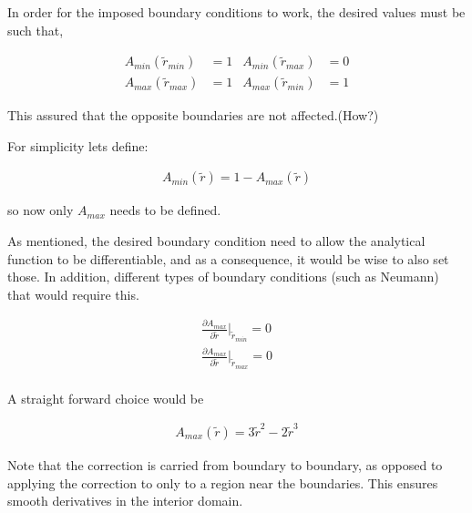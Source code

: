 \documentclass[a4paper]{article}
\begin{document}
In order for the imposed boundary conditions to work, the desired values must be 
such that,

\begin{align*}
    A_{min}(\widetilde{r}_{min}) &= 1 &A_{min}(\widetilde{r}_{max}) &= 0  \\
    A_{max}(\widetilde{r}_{max}) &= 1 &A_{max}(\widetilde{r}_{min}) &= 1 
\end{align*}

This assured that the opposite boundaries are not affected.(How?)

For simplicity lets define:

\begin{align*}
    A_{min}(\widetilde{r}) =
    1-
    A_{max}(\widetilde{r}) 
\end{align*}

so now only $A_{max}$ needs to be defined. 

As mentioned, the desired boundary condition need to allow the analytical function
to be differentiable, and as a consequence, it would be wise to also set those. 
In addition, different types of boundary conditions (such as Neumann) that would 
require this. 

\begin{align*}
    \frac{\partial A_{max} }{\partial \widetilde{r}}|_{\widetilde{r}_{min}} = 0 \\
    \frac{\partial A_{max} }{\partial \widetilde{r}}|_{\widetilde{r}_{max}} = 0 \\
\end{align*}

A straight forward choice would be 

\begin{align*}
    A_{max}(\widetilde{r}) = 
    3 \widetilde{r}^2 - 2 \widetilde{r}^3
\end{align*}

Note that the correction is carried from boundary to boundary, as opposed to 
applying the correction to only to a region near the boundaries. This ensures smooth 
derivatives in the interior domain.
    
\end{document}
